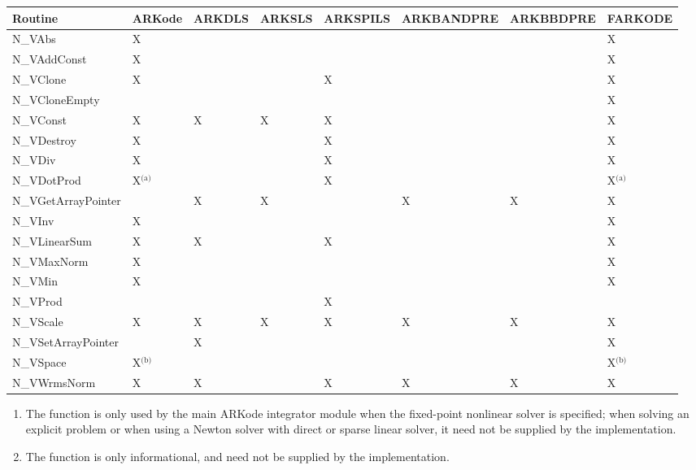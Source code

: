 \documentclass[letterpaper,10pt,english]{sphinxmanual}
\begin{document}
\begin{tabulary}{\linewidth}{|L|L|L|L|L|L|L|L|}
\hline
\textsf{\relax 
Routine
} & \textsf{\relax 
ARKode
} & \textsf{\relax 
ARKDLS
} & \textsf{\relax 
ARKSLS
} & \textsf{\relax 
ARKSPILS
} & \textsf{\relax 
ARKBANDPRE
} & \textsf{\relax 
ARKBBDPRE
} & \textsf{\relax 
FARKODE
}\\
\hline
N\_VAbs
 & 
X
 &  &  &  &  &  & 
X
\\
\hline
N\_VAddConst
 & 
X
 &  &  &  &  &  & 
X
\\
\hline
N\_VClone
 & 
X
 &  &  & 
X
 &  &  & 
X
\\
\hline
N\_VCloneEmpty
 &  &  &  &  &  &  & 
X
\\
\hline
N\_VConst
 & 
X
 & 
X
 & 
X
 & 
X
 &  &  & 
X
\\
\hline
N\_VDestroy
 & 
X
 &  &  & 
X
 &  &  & 
X
\\
\hline
N\_VDiv
 & 
X
 &  &  & 
X
 &  &  & 
X
\\
\hline
N\_VDotProd
 & 
X$^{\text{(a)}}$
 &  &  & 
X
 &  &  & 
X$^{\text{(a)}}$
\\
\hline
N\_VGetArrayPointer
 &  & 
X
 & 
X
 &  & 
X
 & 
X
 & 
X
\\
\hline
N\_VInv
 & 
X
 &  &  &  &  &  & 
X
\\
\hline
N\_VLinearSum
 & 
X
 & 
X
 &  & 
X
 &  &  & 
X
\\
\hline
N\_VMaxNorm
 & 
X
 &  &  &  &  &  & 
X
\\
\hline
N\_VMin
 & 
X
 &  &  &  &  &  & 
X
\\
\hline
N\_VProd
 &  &  &  & 
X
 &  &  & \\
\hline
N\_VScale
 & 
X
 & 
X
 & 
X
 & 
X
 & 
X
 & 
X
 & 
X
\\
\hline
N\_VSetArrayPointer
 &  & 
X
 &  &  &  &  & 
X
\\
\hline
N\_VSpace
 & 
X$^{\text{(b)}}$
 &  &  &  &  &  & 
X$^{\text{(b)}}$
\\
\hline
N\_VWrmsNorm
 & 
X
 & 
X
 &  & 
X
 & 
X
 & 
X
 & 
X
\\
\hline\end{tabulary}

\begin{enumerate}
\item {} 
The {\hyperref[nvectors/index:c.N_VDotProd]{\emph{}}} function is only used by the main
ARKode integrator module when the fixed-point nonlinear solver is
specified; when solving an explicit problem or when using a Newton
solver with direct or sparse linear solver, it need not be
supplied by the  implementation.

\item {} 
The {\hyperref[nvectors/index:c.N_VSpace]{\emph{}}} function is only informational, and need
not be supplied by the  implementation.

\end{enumerate}
\end{document}

